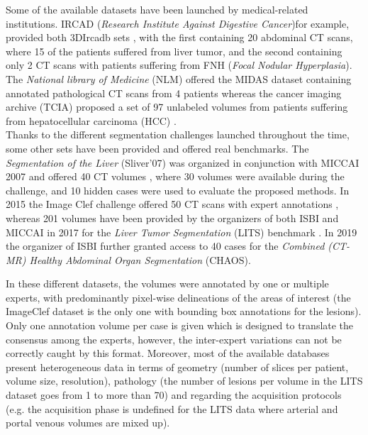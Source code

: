 Some of the available datasets have been launched by medical-related
institutions. IRCAD (\emph{Research Institute Against Digestive Cancer})for example, provided both 3DIrcadb sets \cite{3DIrcadB}, with the first containing 20 abdominal CT
scans, where 15 of the patients suffered from liver tumor, and the
second containing only 2 CT scans with patients suffering from FNH
(\emph{Focal Nodular Hyperplasia}).
The \emph{National library of Medicine} (NLM) offered the MIDAS dataset
containing annotated pathological CT scans from 4 patients \cite{MIDAS} whereas the cancer imaging archive (TCIA)
proposed a set of 97 unlabeled volumes from patients suffering from
hepatocellular carcinoma (HCC) \cite{Clark2013}. \\
Thanks to the different segmentation challenges launched throughout the
time, some other sets have been provided and offered real benchmarks.
The \emph{Segmentation of the Liver} (Sliver'07) was organized in
conjunction with MICCAI 2007 and offered 40 CT volumes \cite{VanGinneken2007}, where 30
volumes were available during the challenge, and 10 hidden cases were
used to evaluate the proposed methods. In 2015 the Image Clef challenge
offered 50 CT scans with expert annotations \cite{ImageClef}, whereas 201 volumes have been provided by the organizers
of both ISBI and MICCAI in 2017 for the \emph{Liver Tumor Segmentation}
(LITS) benchmark \cite{Bilic2019}. In 2019 the organizer of ISBI
further granted access to 40 cases for the \emph{Combined (CT-MR)
	Healthy Abdominal Organ Segmentation} (CHAOS)\cite{CHAOS}.

In these different datasets, the volumes were annotated by one or
multiple experts, with predominantly pixel-wise delineations of the
areas of interest (the ImageClef dataset is the only one with bounding
box annotations for the lesions). Only one annotation volume per case is
given which is designed to translate the consensus among the experts,
however, the inter-expert variations can not be correctly caught by this
format. Moreover, most of the available databases present heterogeneous
data in terms of geometry (number of slices per patient, volume size,
resolution), pathology (the number of lesions per volume in the LITS
dataset goes from 1 to more than 70) and regarding the
acquisition protocols (e.g. the acquisition phase is undefined for the
LITS data where arterial and portal venous volumes are mixed up).\\


